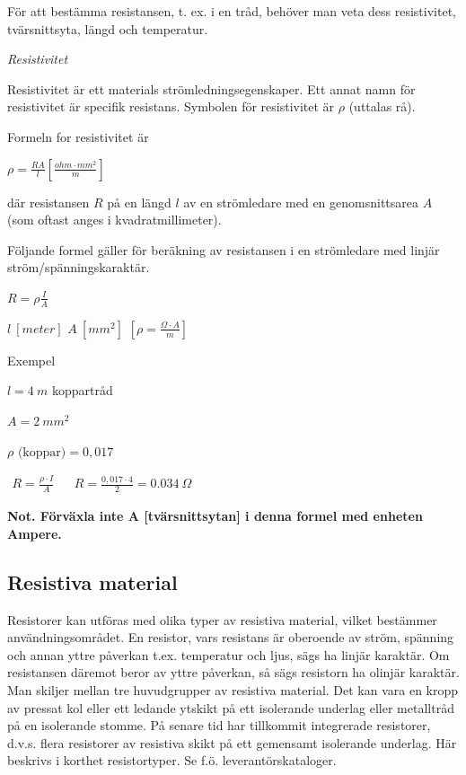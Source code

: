 För att bestämma resistansen, t. ex. i en tråd,
behöver man veta dess resistivitet, tvärsnittsyta, längd och temperatur.

\emph{Resistivitet}

Resistivitet är ett materials strömledningsegenskaper. Ett annat namn för
resistivitet är specifik resistans. Symbolen för resistivitet är \(\rho\)
(uttalas rå).

Formeln for resistivitet är

\(\rho = \frac{R A}{l} \left[\frac{ohm \cdot mm^2}{m}\right]\)

där resistansen \(R\) på en längd \(l\) av en strömledare med en
genomsnittsarea \(A\) (som oftast anges i kvadratmillimeter).

Följande formel gäller för beräkning av resistansen i en strömledare med
linjär ström/spänningskaraktär.

\(R = \rho \frac{I}{A} \)

\(l\ [meter]\) \(A\ [mm^2]\) \(\left[\rho = \frac{\Omega \cdot A}{m} \right]\)

Exempel

\(l = 4\ m\) koppartråd

\(A = 2\ mm^2\)

\(\rho \text{ (koppar)} = 0,017\)

\(
\begin{array}{lll}
R = \frac{\rho \cdot I}{A} & & R = \frac{0,017 \cdot 4}{2} = 0.034\ \Omega
\end{array}
\)

\textbf{Not. Förväxla inte A [tvärsnittsytan] i denna formel med enheten Ampere.}

\subsection{Resistiva material}

Resistorer kan utföras med olika typer av resistiva material, vilket bestämmer
användningsområdet. En resistor, vars resistans är oberoende av ström, spänning
och annan yttre påverkan t.ex. temperatur och ljus, sägs ha linjär karaktär.
Om resistansen däremot beror av yttre påverkan, så sägs resistorn ha olinjär
karaktär. Man skiljer mellan tre huvudgrupper av resistiva material. Det kan
vara en kropp av pressat kol eller ett ledande ytskikt på ett isolerande
underlag eller metalltråd på en isolerande stomme. På senare tid har tillkommit
integrerade resistorer, d.v.s. flera resistorer av resistiva skikt på ett
gemensamt isolerande underlag. Här beskrivs i korthet resistortyper.
Se f.ö. leverantörskataloger.

